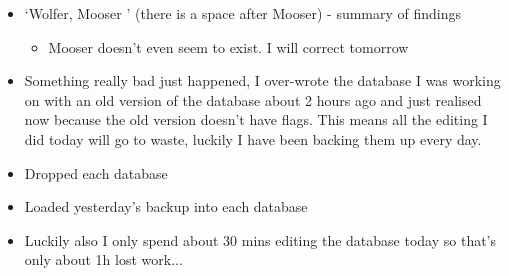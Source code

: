 \documentclass[12pt]{article}
\begin{document}
\begin{itemize}
\begin{itemize}
    \end{itemize}
    \item `Wolfer, Mooser ' (there is a space after Mooser) - summary of findings
    \begin{itemize}
        \item Mooser doesn't even seem to exist. I will correct tomorrow
    \end{itemize}
    \item Something really bad just happened, I over-wrote the database I was working on with an old version of the database about 2 hours ago and just realised now because the old version doesn't have flags. This means all the editing I did today will go to waste, luckily I have been backing them up every day.
    \item Dropped each database
    \item Loaded yesterday's backup into each database
    \item Luckily also I only spend about 30 mins editing the database today so that's only about 1h lost work...
    
    
\end{itemize}
\end{document}

